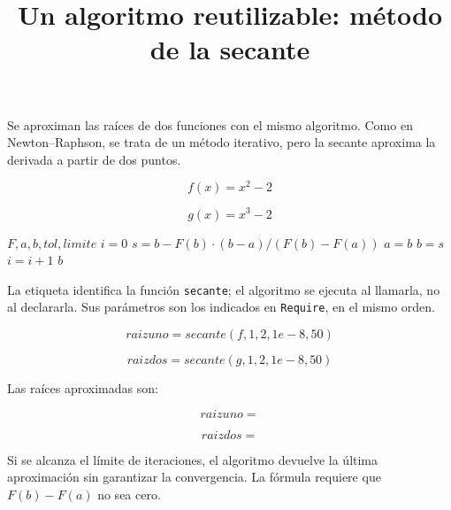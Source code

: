 \documentclass{article}
\title{Un algoritmo reutilizable: m\'etodo de la secante}
\date{}
\begin{document}
\maketitle

Se aproximan las ra\'ices de dos funciones con el mismo algoritmo.
Como en Newton--Raphson, se trata de un m\'etodo iterativo, pero la
secante aproxima la derivada a partir de dos puntos.

\begin{equation}
    f(x) = x^2 - 2
    \label{eq:calc:f}
\end{equation}

\begin{equation}
    g(x) = x^3 - 2
    \label{eq:calc:g}
\end{equation}

\begin{algorithm}
\caption{M\'etodo de la secante}
\label{alg:calc:secante}
\begin{algorithmic}
    \REQUIRE $F, a, b, tol, limite$
    \STATE $i = 0$
        \STATE $s = b - F(b) \cdot (b - a) / (F(b) - F(a))$
        \STATE $a = b$
        \STATE $b = s$
        \STATE $i = i + 1$
    \ENDWHILE
    \RETURN $b$
\end{algorithmic}
\end{algorithm}

La etiqueta identifica la funci\'on \texttt{secante}; el algoritmo se
ejecuta al llamarla, no al declararla. Sus par\'ametros son los indicados
en \texttt{Require}, en el mismo orden.

\begin{equation}
    raizuno = secante(f, 1, 2, 1e-8, 50)
    \label{eq:calc:raizuno}
\end{equation}

\begin{equation}
    raizdos = secante(g, 1, 2, 1e-8, 50)
    \label{eq:calc:raizdos}
\end{equation}

Las ra\'ices aproximadas son:

\begin{equation}
    raizuno =
    \label{eq:res:raizuno}
\end{equation}

\begin{equation}
    raizdos =
    \label{eq:res:raizdos}
\end{equation}

Si se alcanza el l\'imite de iteraciones, el algoritmo devuelve la
\'ultima aproximaci\'on sin garantizar la convergencia. La f\'ormula
requiere que $F(b) - F(a)$ no sea cero.
\end{document}
